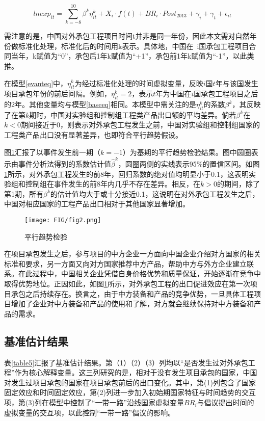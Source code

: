\documentclass[a4paper,12pt]{article}
\begin{document}
\begin{equation}\label{evanteq}
	lnexp_{it}=\sum_{k=-8}^{10}\beta^{k}\eta_{it}^{k} + X_{i}·f(t)+BR_{i}·Post_{2013}+\gamma_{i} +\gamma_{t}+\epsilon_{it}
\end{equation}

需注意的是，中国对外承包工程项目时间t并非是同一年份，因此本文需对自然年份做标准化处理，标准化后的时间用k表示。具体地，中国在\ i国承包工程项目合同当年，k赋值为“0”，承包后1年k赋值为“+1”，承包前1年k赋值为“-1”，以此类推。

\vspace{0.5em}  %

在模型\ref{evanteq}中，$\eta_{it}^k$为经过标准化处理的时间虚拟变量，反映$i$国$t$年与该国发生项目承包年份的前后间隔。例如，$\eta_{it}^k=2$，表示$t$年为中国在$i$国承包工程项目之后的2年。其他变量均与模型\ref{baseeq}相同。本模型中需关注的是$\eta_{it}^k$的系数$\beta^k$，其反映了在第$k$期时，中国对实验组和控制组工程类产品出口额的平均差异。倘若$\beta^k$在$k<0$期间接近于0，则表示对外承包工程发生之前，中国对实验组和控制组国家的工程类产品出口没有显著差异，也即符合平行趋势假设。

\vspace{0.5em}  %

图\ref{fig2}汇报了以事件发生前一期$（k=-1）$为基期的平行趋势检验结果。图中圆圈表示由事件分析法得到的系数估计值${\hat{\beta}}^k$，圆圈两侧的实线表示95\%的置信区间。如图\ref{fig2}所示，对外承包工程发生的前8年，回归系数的绝对值均明显小于0.1，这表明实验组和控制组在事件发生的前8年内几乎不存在差异。相反，在$k>0$的期间，除了第1期，所有$\beta^k$的估计值均大于或十分接近0.1，这说明在对外承包工程发生之后，中国对相应国家的工程产品出口相对于其他国家显著增加。


\begin{figure}[htbp]
	\centering
	\texttt{[image: FIG/fig2.png]}
	\captionsetup{labelformat=default,labelsep=period}
	\caption{平行趋势检验}\label{fig2}
\end{figure} 


在项目承包发生之后，参与项目的中方企业一方面向中国企业介绍对方国家的相关标准和要求，另一方面又向对方国家推荐中方产品，帮助中方与外方企业建立联系。在此过程中，中国相关企业凭借自身价格优势和质量保证，开始逐渐在竞争中取得优势地位。正因如此，如图\ref{fig2}所示，对外承包工程的出口促进效应在第一次项目承包之后持续存在。换言之，由于中方装备和产品的竞争优势，一旦具体工程项目增加了企业对中方装备和产品的使用和了解，对方就会继续保持对中方装备和产品的需求。


\subsection{基准估计结果}
表\ref{table5}汇报了基准估计结果。第（1）（2）（3）列均以“是否发生过对外承包工程”作为核心解释变量。这三列研究的是，相对于没有发生项目承包的国家，中国对发生过项目承包的国家在项目承包前后的出口变化。其中，第(1)列包含了国家固定效应和时间固定效应，第(2)列进一步加入初始期国家特征与时间趋势的交互项，第(3)列在模型中控制了“一带一路”沿线国家虚拟变量${BR}_i$与倡议提出时间的虚拟变量的交互项，以此控制“一带一路”倡议的影响。
\end{document}
